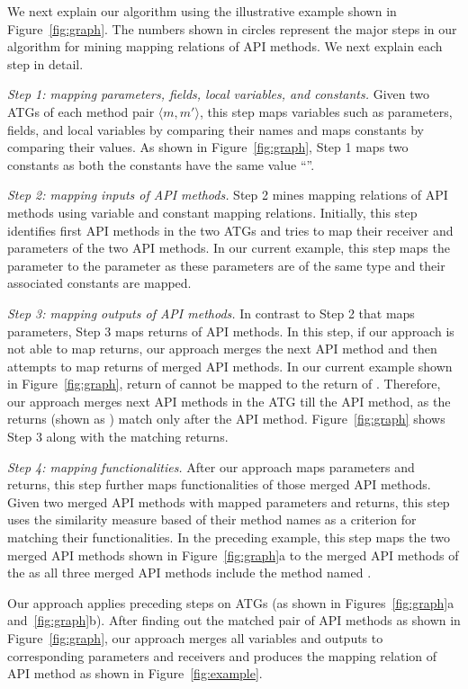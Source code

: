 We next explain our algorithm using the illustrative example shown
in Figure~\ref{fig:graph}. The numbers shown in circles
represent the major steps in our algorithm for mining mapping
relations of API methods. We next explain each step in detail.

\emph{Step 1: mapping parameters, fields, local variables, and constants.}
Given two ATGs of each method pair $\langle m, m' \rangle$, this step maps
variables such as parameters, fields, and local variables by comparing their names
and maps constants by comparing their values. As shown in
Figure~\ref{fig:graph}, Step 1 maps two constants as both the constants
have the same value ``''.

\emph{Step 2: mapping inputs of API methods.} Step 2 mines mapping
relations of API methods using variable and constant mapping relations.
Initially, this step identifies first API methods in the two ATGs and tries to
map their receiver and parameters of the two API methods.
In our current example, this step maps the parameter 
to the parameter  as these parameters
are of the same type and their associated constants are mapped.

\emph{Step 3: mapping outputs of API methods.} In contrast to Step 2
that maps parameters, Step 3 maps returns of API methods. In
this step, if our approach is not able to map returns, our
approach merges the next API method and then attempts to map returns of merged API methods. In our current example shown in
Figure~\ref{fig:graph}, return of
 cannot be mapped to the
return of . Therefore, our
approach merges next API methods in the ATG till the 
API method, as the returns (shown as ) match
only after the  API method. Figure~\ref{fig:graph}
shows Step 3 along with the matching returns.

\emph{Step 4: mapping functionalities.} After our approach maps
parameters and returns, this step further maps functionalities
of those merged API methods. Given two merged API methods with
mapped parameters and returns, this step uses the similarity
measure based of their method names as a criterion for matching
their functionalities. In the preceding example, this step maps the
two merged API methods shown in Figure~\ref{fig:graph}a to the
merged API methods of the  as all
three merged API methods include the method named .

Our approach applies preceding steps on ATGs (as shown in
Figures~\ref{fig:graph}a and~\ref{fig:graph}b). After finding out
the matched pair of API methods as shown in Figure~\ref{fig:graph},
our approach merges all variables and outputs to corresponding
parameters and receivers and produces the mapping relation of API
method as shown in Figure~\ref{fig:example}.
